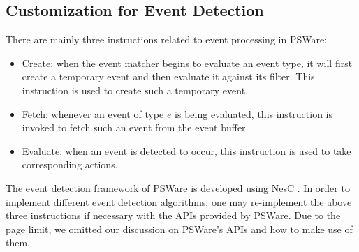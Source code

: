 \subsection{Customization for Event Detection}
There are mainly three instructions related to event processing in PSWare:
\begin{itemize}
\item Create: when the event matcher begins to evaluate an event type, it will first create a temporary event and then evaluate it against its filter. This instruction is used to create such a temporary event.
\item Fetch: whenever an event of type \(e\) is being evaluated, this instruction is invoked to fetch such an event from the event buffer.
\item Evaluate: when an event is detected to occur, this instruction is used to take corresponding actions.
\end{itemize}

The event detection framework of PSWare is developed using NesC \cite{nesc}. In order to implement different event detection algorithms, one may re-implement the above three instructions if necessary with the APIs provided by PSWare. Due to the page limit, we omitted our discussion on PSWare's APIs and how to make use of them.
